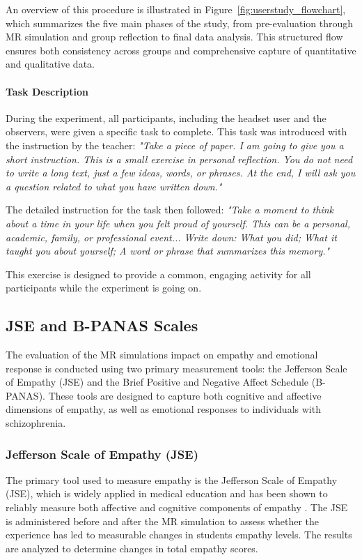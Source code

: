 An overview of this procedure is illustrated in Figure~\ref{fig:userstudy_flowchart}, which summarizes the five main phases of the study, from pre-evaluation through MR simulation and group reflection to final data analysis. This structured flow ensures both consistency across groups and comprehensive capture of quantitative and qualitative data.

\paragraph{Task Description}
During the experiment, all participants, including the headset user and the observers, were given a specific task to complete. This task was introduced with the instruction by the teacher: \textit{"Take a piece of paper. I am going to give you a short instruction. This is a small exercise in personal reflection. You do not need to write a long text, just a few ideas, words, or phrases. At the end, I will ask you a question related to what you have written down."}

The detailed instruction for the task then followed: \textit{"Take a moment to think about a time in your life when you felt proud of yourself. This can be a personal, academic, family, or professional event... Write down: What you did; What it taught you about yourself; A word or phrase that summarizes this memory."} 

This exercise is designed to provide a common, engaging activity for all participants while the experiment is going on.

\subsection{JSE and B-PANAS Scales}
\label{ch:eval}
The evaluation of the MR simulations impact on empathy and emotional response is conducted using two primary measurement tools: the Jefferson Scale of Empathy (JSE) and the Brief Positive and Negative Affect Schedule (B-PANAS). These tools are designed to capture both cognitive and affective dimensions of empathy, as well as emotional responses to individuals with schizophrenia.

\subsubsection{Jefferson Scale of Empathy (JSE)}
\label{sec:jse}

The primary tool used to measure empathy is the Jefferson Scale of Empathy (JSE), which is widely applied in medical education and has been shown to reliably measure both affective and cognitive components of empathy \cite{Hojat2002}. The JSE is administered before and after the MR simulation to assess whether the experience has led to measurable changes in students empathy levels. The results are analyzed to determine changes in total empathy scores.

